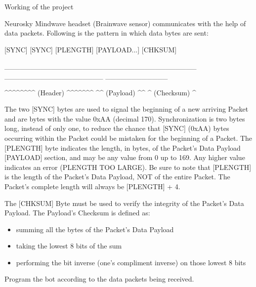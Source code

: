 \documentclass[14pt]{article}
\begin{document}
\break

\begin{center}
{\Huge Working of the project}
\end{center}

Neurosky Mindwave headset (Brainwave sensor) communicates with the help of data packets. Following is the pattern in which data bytes are sent:

{\raggedright
[SYNC] [SYNC] [PLENGTH]      [PAYLOAD...]     [CHKSUM]
}

{\raggedright
\_\_\_\_\_\_\_\_\_\_\_\_\_\_\_\_\_\_\_\_\_\_\_\_\_\_\_\_\_\_\_\_\_\_\_\_\_     \_\_\_\_\_\_\_\_\_\_\_\_\_\_\_\_\_\_\_
    \_\_\_\_\_\_\_\_\_\_\_\_
}

{\raggedright
\textasciicircum{}\textasciicircum{}\textasciicircum{}\textasciicircum{}\textasciicircum{}\textasciicircum{}\textasciicircum{}\textasciicircum{}
(Header)
\textasciicircum{}\textasciicircum{}\textasciicircum{}\textasciicircum{}\textasciicircum{}\textasciicircum{}\textasciicircum{}
       \textasciicircum{}\textasciicircum{} (Payload)
\textasciicircum{}\textasciicircum{}     \textasciicircum{} (Checksum)
\textasciicircum{}
}

The two [SYNC] bytes are used to signal the beginning of a new arriving Packet and are bytes with the value 0xAA (decimal 170). Synchronization is two bytes long, instead of only one, to reduce the chance that [SYNC] (0xAA) bytes occurring within the Packet could be mistaken for the beginning of a Packet.
The [PLENGTH] byte indicates the length, in bytes, of the Packet's Data Payload [PAYLOAD] section, and may be any value from 0 up to 169. Any higher value indicates an error (PLENGTH TOO LARGE). Be sure to note that [PLENGTH] is the length of the Packet's Data Payload, NOT of the entire Packet. The Packet's complete length will always be [PLENGTH] + 4.


The [CHKSUM] Byte must be used to verify the integrity of the Packet's Data Payload. The Payload's Checksum is defined as:

\begin{itemize}
	\item summing all the bytes of the Packet's Data Payload
	\item taking the lowest 8 bits of the sum
	\item performing the bit inverse (one's compliment inverse) on those lowest 8 bits
\end{itemize}

{\raggedright
Program the bot according to the data packets being received.
}
\end{document}
